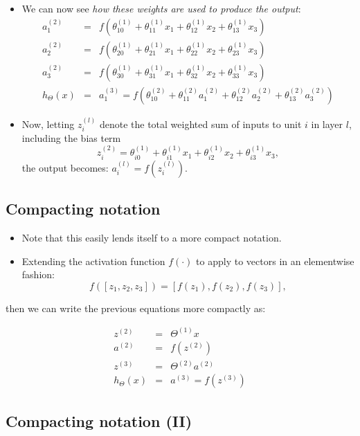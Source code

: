 \documentclass[
  letterpaper,
  DIV=11,
  numbers=noendperiod]{scrartcl}
\begin{document}
\begin{itemize}
\item
  We can now see \emph{how these weights are used to produce the
  output}: \begin{eqnarray}
  a_1^{(2)}&=&f(\theta_{10}^{(1)}+\theta_{11}^{(1)}x_1+\theta_{12}^{(1)}x_2+\theta_{13}^{(1)}x_3)\\
  a_2^{(2)}&=&f(\theta_{20}^{(1)}+\theta_{21}^{(1)}x_1+\theta_{22}^{(1)}x_2+\theta_{23}^{(1)}x_3)\\
  a_3^{(2)}&=&f(\theta_{30}^{(1)}+\theta_{31}^{(1)}x_1+\theta_{32}^{(1)}x_2+\theta_{33}^{(1)}x_3)\\
  h_{\Theta}(x)&=&a_1^{(3)}=f(\theta_{10}^{(2)}+\theta_{11}^{(2)}a_1^{(2)}+\theta_{12}^{(2)}a_2^{(2)}+\theta_{13}^{(2)}a_3^{(2)})
  \end{eqnarray}
\item
  Now, letting \(z_i^{(l)}\) denote the total weighted sum of inputs to
  unit \(i\) in layer \(l\), including the bias term
  \[z_i^{(2)}=\theta_{i0}^{(1)}+\theta_{i1}^{(1)}x_1+\theta_{i2}^{(1)}x_2+\theta_{i3}^{(1)}x_3,
  \] the output becomes: \(a_i^{(l)}=f(z_i^{(l)})\).
\end{itemize}

\hypertarget{compacting-notation}{%
\subsection{Compacting notation}\label{compacting-notation}}

\begin{itemize}
\item
  Note that this easily lends itself to a more compact notation.
\item
  Extending the activation function \(f(\cdot)\) to apply to vectors in
  an elementwise fashion: \[
  f([z_1,z_2,z_3]) = [f(z_1), f(z_2),f(z_3)],
  \]
\end{itemize}

then we can write the previous equations more compactly as:

\begin{eqnarray}
z^{(2)}&=&\Theta^{(1)}x\nonumber\\
a^{(2)}&=&f(z^{(2)})\nonumber\\
z^{(3)}&=&\Theta^{(2)}a^{(2)}\nonumber\\
h_{\Theta}(x)&=&a^{(3)}=f(z^{(3)})\nonumber
\end{eqnarray}

\hypertarget{compacting-notation-ii}{%
\subsection{Compacting notation (II)}\label{compacting-notation-ii}}
\end{document}
